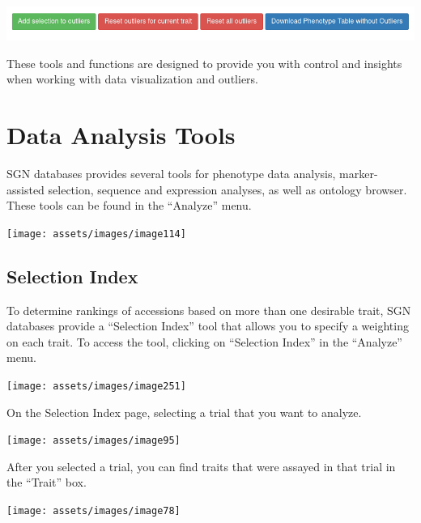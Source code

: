 \documentclass[
  12pt,
]{book}
\begin{document}
\begin{center}\includegraphics[width=0.95\linewidth]{assets/images/outliers_dataset_actions} \end{center}

These tools and functions are designed to provide you with control and insights when working with data visualization and outliers.

\hypertarget{data-analysis-tools}{%
\chapter{Data Analysis Tools}\label{data-analysis-tools}}

SGN databases provides several tools for phenotype data analysis, marker-assisted selection, sequence and expression analyses, as well as ontology browser. These tools can be found in the ``Analyze'' menu.

\begin{center}\texttt{[image: assets/images/image114]} \end{center}

\hypertarget{selection-index}{%
\section{Selection Index}\label{selection-index}}

To determine rankings of accessions based on more than one desirable trait, SGN databases provide a ``Selection Index'' tool that allows you to specify a weighting on each trait. To access the tool, clicking on ``Selection Index'' in the ``Analyze'' menu.

\begin{center}\texttt{[image: assets/images/image251]} \end{center}

On the Selection Index page, selecting a trial that you want to analyze.

\begin{center}\texttt{[image: assets/images/image95]} \end{center}

After you selected a trial, you can find traits that were assayed in that trial in the ``Trait'' box.

\begin{center}\texttt{[image: assets/images/image78]} \end{center}
\end{document}
